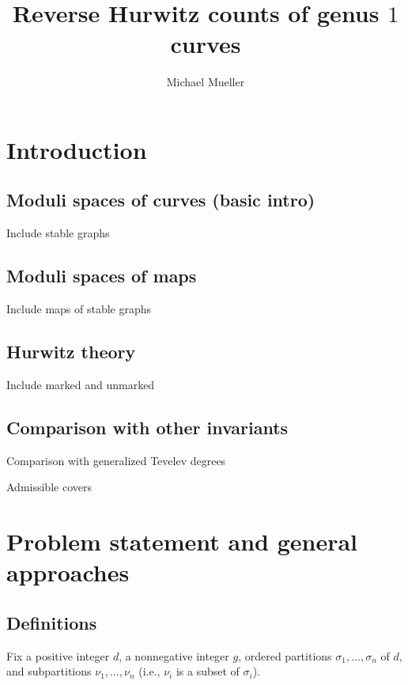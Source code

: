 \documentclass[11pt]{article}           %
\theoremstyle{definition}
\begin{document}
\title{Reverse Hurwitz counts of genus $1$ curves}

\author{Michael Mueller}

\maketitle


\tableofcontents

\section{Introduction}

\subsection{Moduli spaces of curves (basic intro)}

Include stable graphs

\subsection{Moduli spaces of maps}

Include maps of stable graphs

\subsection{Hurwitz theory}

Include marked and unmarked

\subsection{Comparison with other invariants}

Comparison with generalized Tevelev degrees

Admissible covers

\section{Problem statement and general approaches}

\subsection{Definitions}
Fix a positive integer $d$, a nonnegative integer $g$, ordered partitions $\sigma_1,\dots,\sigma_n$ of $d$, and subpartitions $\nu_1,\dots,\nu_n$ (i.e., $\nu_i$ is a subset of $\sigma_i$).
\end{document}
